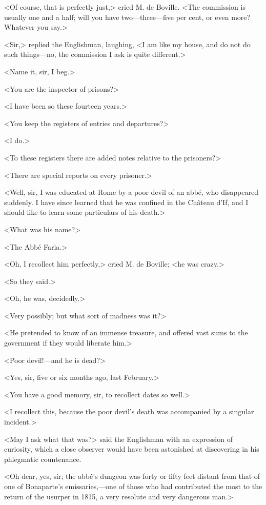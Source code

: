  <Of course, that is perfectly just,> cried M. de Boville. <The commission is usually one and a half; will you have two—three—five per cent, or even more? Whatever you say.> 

 <Sir,> replied the Englishman, laughing, <I am like my house, and do not do such things—no, the commission I ask is quite different.> 

 <Name it, sir, I beg.> 

 <You are the inspector of prisons?> 

 <I have been so these fourteen years.> 

 <You keep the registers of entries and departures?> 

 <I do.> 

 <To these registers there are added notes relative to the prisoners?> 

 <There are special reports on every prisoner.> 

 <Well, sir, I was educated at Rome by a poor devil of an abbé, who disappeared suddenly. I have since learned that he was confined in the Château d'If, and I should like to learn some particulars of his death.> 

 <What was his name?> 

 <The Abbé Faria.> 

 <Oh, I recollect him perfectly,> cried M. de Boville; <he was crazy.> 

 <So they said.> 

 <Oh, he was, decidedly.> 

 <Very possibly; but what sort of madness was it?> 

 <He pretended to know of an immense treasure, and offered vast sums to the government if they would liberate him.> 

 <Poor devil!—and he is dead?> 

 <Yes, sir, five or six months ago, last February.> 

 <You have a good memory, sir, to recollect dates so well.> 

 <I recollect this, because the poor devil's death was accompanied by a singular incident.> 

 <May I ask what that was?> said the Englishman with an expression of curiosity, which a close observer would have been astonished at discovering in his phlegmatic countenance. 

 <Oh dear, yes, sir; the abbé's dungeon was forty or fifty feet distant from that of one of Bonaparte's emissaries,—one of those who had contributed the most to the return of the usurper in 1815, a very resolute and very dangerous man.> 

